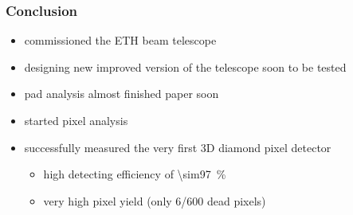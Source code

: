 \begin{frame}
	\frametitle{Conclusion}
	\begin{minipage}[c][4cm]{\textwidth}
		\begin{itemize}
			\itemfill
			\item commissioned the ETH beam telescope
			\item designing new improved version of the telescope \ra soon to be tested
			\item pad analysis almost finished \ra paper soon
			\item started pixel analysis
			\item successfully measured the very first 3D diamond pixel detector
			\begin{itemize}
				\item high detecting efficiency of \SI{\sim97}{\%}
				\item very high pixel yield (only 6/600 dead pixels)
			\end{itemize}
		\end{itemize}
	\end{minipage}
\end{frame}
